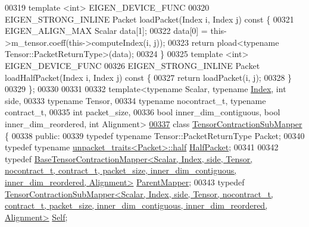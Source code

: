 \begin{DoxyCode}
00319   \textcolor{keyword}{template} <\textcolor{keywordtype}{int}> EIGEN\_DEVICE\_FUNC
00320   EIGEN\_STRONG\_INLINE Packet loadPacket(Index i, Index j)\textcolor{keyword}{ const }\{
00321     EIGEN\_ALIGN\_MAX Scalar data[1];
00322     data[0] = this->m\_tensor.coeff(this->computeIndex(i, j));
00323     \textcolor{keywordflow}{return} pload<typename Tensor::PacketReturnType>(data);
00324   \}
00325   \textcolor{keyword}{template} <\textcolor{keywordtype}{int}> EIGEN\_DEVICE\_FUNC
00326   EIGEN\_STRONG\_INLINE Packet loadHalfPacket(Index i, Index j)\textcolor{keyword}{ const }\{
00327     \textcolor{keywordflow}{return} loadPacket(i, j);
00328   \}
00329 \};
00330 
00331 
00332 \textcolor{keyword}{template}<\textcolor{keyword}{typename} Scalar, \textcolor{keyword}{typename} \hyperlink{namespace_eigen_a62e77e0933482dafde8fe197d9a2cfde}{Index}, \textcolor{keywordtype}{int} side,
00333          \textcolor{keyword}{typename} Tensor,
00334          \textcolor{keyword}{typename} nocontract\_t, \textcolor{keyword}{typename} contract\_t,
00335          \textcolor{keywordtype}{int} packet\_size,
00336          \textcolor{keywordtype}{bool} inner\_dim\_contiguous, \textcolor{keywordtype}{bool} inner\_dim\_reordered, \textcolor{keywordtype}{int} Alignment>
\hyperlink{class_eigen_1_1internal_1_1_tensor_contraction_sub_mapper}{00337} \textcolor{keyword}{class }\hyperlink{class_eigen_1_1internal_1_1_tensor_contraction_sub_mapper}{TensorContractionSubMapper} \{
00338  \textcolor{keyword}{public}:
00339   \textcolor{keyword}{typedef} \textcolor{keyword}{typename} Tensor::PacketReturnType Packet;
00340   \textcolor{keyword}{typedef} \textcolor{keyword}{typename} \hyperlink{union_eigen_1_1internal_1_1_packet}{unpacket\_traits<Packet>::half} 
      \hyperlink{union_eigen_1_1internal_1_1_packet}{HalfPacket};
00341 
00342   \textcolor{keyword}{typedef} 
      \hyperlink{class_eigen_1_1internal_1_1_base_tensor_contraction_mapper}{BaseTensorContractionMapper<Scalar, Index, side, Tensor, nocontract\_t, contract\_t, packet\_size,
       inner\_dim\_contiguous, inner\_dim\_reordered, Alignment>}
       \hyperlink{class_eigen_1_1internal_1_1_base_tensor_contraction_mapper}{ParentMapper};
00343   \textcolor{keyword}{typedef} 
      \hyperlink{class_eigen_1_1internal_1_1_tensor_contraction_sub_mapper}{TensorContractionSubMapper<Scalar, Index, side, Tensor, nocontract\_t, contract\_t, packet\_size,
       inner\_dim\_contiguous, inner\_dim\_reordered, Alignment>}
       \hyperlink{class_eigen_1_1internal_1_1_tensor_contraction_sub_mapper}{Self};

\end{DoxyCode}
